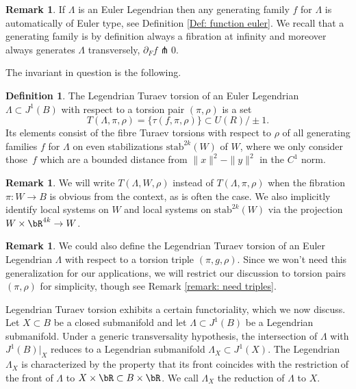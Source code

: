 \documentclass[JEP,XML,SOM,Unicode,NoFloatCountersInSection]{cedram}
\newcommand{\stab}{\mathrm{stab}}
\theoremstyle{plain}
\theoremstyle{definition}
\newtheorem{definition}[theorem]{Definition}
\newtheorem{remark}[theorem]{Remark}
\begin{document}
\begin{remark} If $\Lambda$ is an Euler Legendrian then any generating family $f$ for $\Lambda$ is automatically of Euler type, see Definition \ref{Def: function euler}. We recall that a generating family is by definition always a fibration at infinity and moreover always generates $\Lambda$ transversely, \ie $\partial_F f \pitchfork 0$.
\end{remark}

The invariant in question is the following.

\begin{definition}
The Legendrian Turaev torsion of an Euler Legendrian $\Lambda\!\subset\!J^1(B)$ with respect to a torsion pair $(\pi, \rho)$ is a set
\[
T(\Lambda, \pi, \rho) = \{ \tau(f, \pi, \rho) \} \subset U(R) / \pm 1.
\]
Its elements consist of the fibre Turaev torsions with respect to $\rho$ of all generating families $f$ for $\Lambda$ on even stabilizations $\stab ^{2k}(W)$ of $W$, where we only consider those~$f$ which are a bounded distance from $\|x\|^2-\|y\|^2$ in the $C^1$ norm.
\end{definition}

\begin{remark}
We will write $T(\Lambda, W, \rho)$ instead of $T(\Lambda, \pi, \rho)$ when the fibration $\pi : W \to B$ is obvious from the context, as is often the case. We also implicitly identify local systems on $W$ and local systems on $\stab ^{2k}(W)$ via the projection $W \times \bR^{4k} \to W$.
\end{remark}

\begin{remark}
We could also define the Legendrian Turaev torsion of an Euler Legendrian $\Lambda$ with respect to a torsion triple $(\pi, g, \rho)$. Since we won't need this generalization for our applications, we will restrict our discussion to torsion pairs $(\pi, \rho)$ for simplicity, though see Remark \ref{remark: need triples}.
\end{remark}

Legendrian Turaev torsion exhibits a certain functoriality, which we now discuss. Let $X \subset B$ be a closed submanifold and let $\Lambda \subset J^1(B)$ be a Legendrian submanifold. Under a generic transversality hypothesis, the intersection of $\Lambda$ with $J^1(B)|_X$ reduces to a Legendrian submanifold $\Lambda_X \subset J^1(X)$. The Legendrian $\Lambda_X$ is characterized by the property that its front coincides with the restriction of the front of $\Lambda$ to $X \times \bR \subset B \times \bR$. We call $\Lambda_X$ the reduction of $\Lambda$ to $X$.
\end{document}
